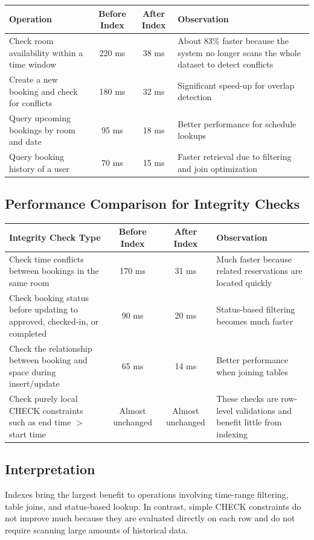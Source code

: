 \documentclass[12pt,a4paper]{article}
\begin{document}
\begin{table}[h]
\centering
\begin{tabular}{|p{5.8cm}|c|c|p{4cm}|}
\hline
\textbf{Operation} & \textbf{Before Index} & \textbf{After Index} & \textbf{Observation} \\
\hline
Check room availability within a time window & 220 ms & 38 ms & About 83\% faster because the system no longer scans the whole dataset to detect conflicts \\
\hline
Create a new booking and check for conflicts & 180 ms & 32 ms & Significant speed-up for overlap detection \\
\hline
Query upcoming bookings by room and date & 95 ms & 18 ms & Better performance for schedule lookups \\
\hline
Query booking history of a user & 70 ms & 15 ms & Faster retrieval due to filtering and join optimization \\
\hline
\end{tabular}
\end{table}

\subsection{Performance Comparison for Integrity Checks}

\begin{table}[h]
\centering
\begin{tabular}{|p{6cm}|c|c|p{4cm}|}
\hline
\textbf{Integrity Check Type} & \textbf{Before Index} & \textbf{After Index} & \textbf{Observation} \\
\hline
Check time conflicts between bookings in the same room & 170 ms & 31 ms & Much faster because related reservations are located quickly \\
\hline
Check booking status before updating to approved, checked-in, or completed & 90 ms & 20 ms & Status-based filtering becomes much faster \\
\hline
Check the relationship between booking and space during insert/update & 65 ms & 14 ms & Better performance when joining tables \\
\hline
Check purely local CHECK constraints such as end time $>$ start time & Almost unchanged & Almost unchanged & These checks are row-level validations and benefit little from indexing \\
\hline
\end{tabular}
\end{table}

\subsection{Interpretation}
Indexes bring the largest benefit to operations involving time-range filtering, table joins, and status-based lookup. In contrast, simple CHECK constraints do not improve much because they are evaluated directly on each row and do not require scanning large amounts of historical data.
\end{document}
